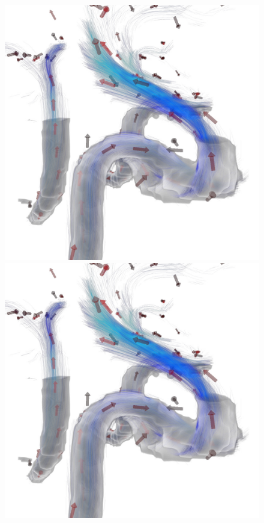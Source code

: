 \documentclass{egpubl}
\begin{document}
\begin{figure}[t]
  \centering
  \begin{minipage}[b]{0.36\linewidth}\centering
    \includegraphics[width=1.0\linewidth]{snapshots/flow/cgf/screenshot_Flow.jpg}
  \end{minipage}\hfill
  \begin{minipage}[b]{0.36\linewidth}\centering
    \includegraphics[trim={18cm 16cm 8cm 10cm}, clip, width=1.0\linewidth]{snapshots/flow/cgf/screenshot_Flow.jpg}

\end{minipage}
\end{figure}
\end{document}

